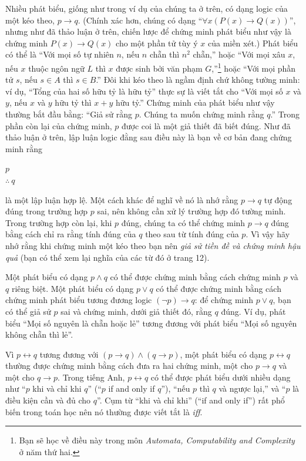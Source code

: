 Nhiều phát biểu, giống như trong ví dụ của chúng ta ở trên, có dạng logic của một kéo theo, $p \to q$. (Chính xác hơn, chúng có dạng ``$\forall x(P(x) \to Q(x))$'', nhưng như đã thảo luận ở trên, chiến lược để chứng minh phát biểu như vậy là chứng minh $P(x) \to Q(x)$ cho một phần tử tùy ý $x$ của miền xét.) Phát biểu có thể là ``Với mọi số tự nhiên $n$, nếu $n$ chẵn thì $n^2$ chẵn,'' hoặc ``Với mọi xâu $x$, nếu $x$ thuộc ngôn ngữ $L$ thì $x$ được sinh bởi văn phạm $G$,''\footnote{Bạn sẽ học về điều này trong môn \emph{Automata, Computability and Complexity} ở năm thứ hai.} hoặc ``Với mọi phần tử $s$, nếu $s \in A$ thì $s \in B$.'' Đôi khi kéo theo là ngầm định chứ không tường minh: ví dụ, ``Tổng của hai số hữu tỷ là hữu tỷ'' thực sự là viết tắt cho ``Với mọi số $x$ và $y$, nếu $x$ và $y$ hữu tỷ thì $x + y$ hữu tỷ.'' Chứng minh của phát biểu như vậy thường bắt đầu bằng: ``Giả sử rằng $p$. Chúng ta muốn chứng minh rằng $q$.'' Trong phần còn lại của chứng minh, $p$ được coi là một giả thiết đã biết đúng. Như đã thảo luận ở trên, lập luận logic đằng sau điều này là bạn về cơ bản đang chứng minh rằng
\begin{center}
$p$\\
$\therefore\ q$
\end{center}
là một lập luận hợp lệ. Một cách khác để nghĩ về nó là nhớ rằng $p \to q$ tự động đúng trong trường hợp $p$ sai, nên không cần xử lý trường hợp đó tường minh. Trong trường hợp còn lại, khi $p$ đúng, chúng ta có thể chứng minh $p \to q$ đúng bằng cách chỉ ra rằng tính đúng của $q$ theo sau từ tính đúng của $p$. Vì vậy hãy nhớ rằng khi chứng minh một kéo theo bạn nên \emph{giả sử tiền đề và chứng minh hậu quả} (bạn có thể xem lại nghĩa của các từ đó ở trang 12).

Một phát biểu có dạng $p \wedge q$ có thể được chứng minh bằng cách chứng minh $p$ và $q$ riêng biệt. Một phát biểu có dạng $p \vee q$ có thể được chứng minh bằng cách chứng minh phát biểu tương đương logic $(\neg p) \to q$: để chứng minh $p \vee q$, bạn có thể giả sử $p$ sai và chứng minh, dưới giả thiết đó, rằng $q$ đúng. Ví dụ, phát biểu ``Mọi số nguyên là chẵn hoặc lẻ'' tương đương với phát biểu ``Mọi số nguyên không chẵn thì lẻ''.

Vì $p \leftrightarrow q$ tương đương với $(p \to q) \wedge (q \to p)$, một phát biểu có dạng $p \leftrightarrow q$ thường được chứng minh bằng cách đưa ra hai chứng minh, một cho $p \to q$ và một cho $q \to p$. Trong tiếng Anh, $p \leftrightarrow q$ có thể được phát biểu dưới nhiều dạng như ``$p$ khi và chỉ khi $q$'' (``$p$ if and only if $q$''), ``nếu $p$ thì $q$ và ngược lại,'' và ``$p$ là điều kiện cần và đủ cho $q$''. Cụm từ ``khi và chỉ khi'' (``if and only if'') rất phổ biến trong toán học nên nó thường được viết tắt là \emph{iff}.

